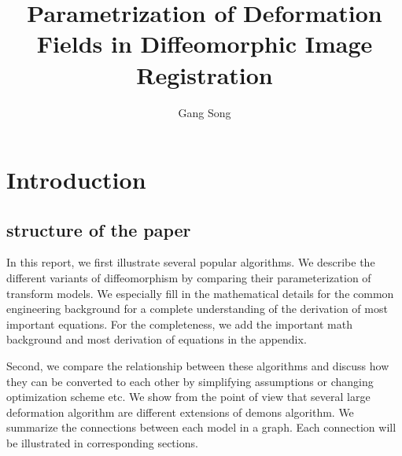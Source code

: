 \documentclass[letterpaper,12pt]{article}
\title{Parametrization of Deformation Fields in Diffeomorphic Image Registration}
\author{Gang Song}
\date{}
\begin{document}
\maketitle
\begin{abstract}
\end{abstract}



\section{Introduction}
\label{sec:intro}











\subsection{structure of the paper}


In this report, we first illustrate several popular algorithms. We describe the different variants of diffeomorphism by comparing their parameterization of transform models. We especially fill in the mathematical details for the common engineering background for a complete understanding of the derivation of most important equations. For the completeness, we add the important math background and most derivation of equations in the appendix. 

Second, we compare the relationship between these algorithms and discuss how they can be converted to each other by simplifying assumptions or changing optimization scheme etc. We show from the point of view that several large deformation algorithm are different extensions of demons algorithm. We summarize the connections between each model in a graph. Each connection will be illustrated in corresponding sections.
\end{document}
